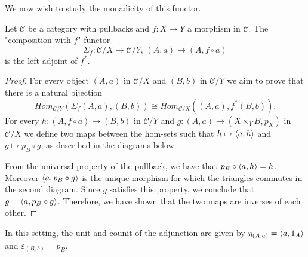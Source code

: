 We now wish to study the monadicity of this functor.
\begin{proposition}
\label{prop:AdjointPullback}
    Let $\mathcal{C}$ be a category with pullbacks and $f:X\to Y$ a morphism in $\mathcal{C}$. The "composition with $f$" functor
    \[ \Sigma_f:\mathcal{C}/X\longrightarrow \mathcal{C}/Y\text{, }(A, a)\to (A, f\circ a) \]
    is the left adjoint of $f^*$.
    \begin{proof}
        For every object $(A,a)$ in $\mathcal{C}/X$ and $(B,b)$ in $\mathcal{C}/Y$ we aim to prove that there is a natural bijection
        \[Hom_{\mathcal{C}/Y}(\Sigma_f(A,a), (B,b))\cong Hom_{\mathcal{C}/X}((A,a), f^*(B,b)).\]
        For every $h:(A,f\circ a)\to (B,b)$ in $\mathcal{C}/Y$ and $g:(A,a)\to (X\times_YB,p_X)$ in $\mathcal{C}/X$ we define two maps between the hom-sets such that $h\mapsto\langle{a},{h}\rangle$ and $g\mapsto p_B\circ g$, as described in the diagrams below.
        \begin{center}
        \end{center}
        From the universal property of the pullback, we have that $p_B\circ\langle{a},{h}\rangle=h$. Moreover $\langle{a},{p_B\circ g}\rangle$ is the unique morphism for which the triangles commutes in the second diagram. Since $g$ satisfies this property, we conclude that $g = \langle{a},{p_B\circ g}\rangle$. Therefore, we have shown that the two maps are inverses of each other.
    \end{proof}
\end{proposition}

In this setting, the unit and counit of the adjunction are given by $\eta_{(A,a)} = \langle{a},{1_A}\rangle$ and $\varepsilon_{(B,b)}=p_B$.

